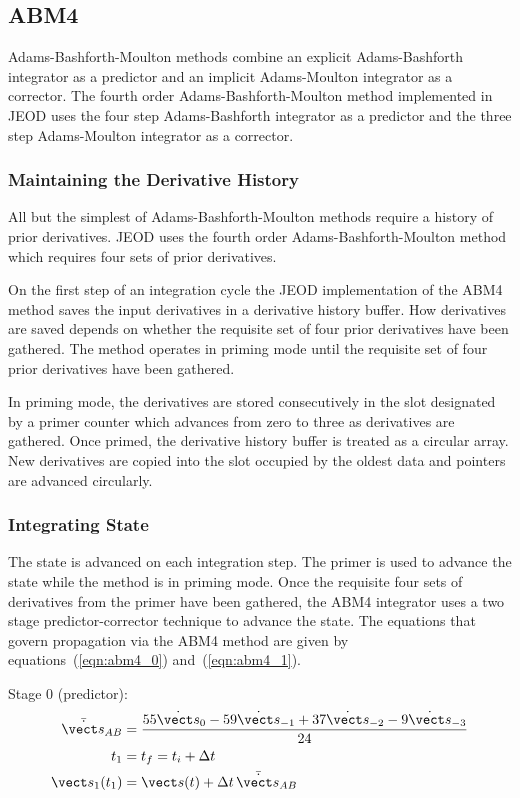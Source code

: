 \subsection{ABM4}

Adams-Bashforth-Moulton methods combine an explicit Adams-Bashforth
integrator as a predictor and an implicit Adams-Moulton integrator
as a corrector. The fourth order Adams-Bashforth-Moulton method
implemented in JEOD uses the four step Adams-Bashforth integrator
as a predictor and the three step Adams-Moulton integrator as a corrector.

\subsubsection{Maintaining the Derivative History}
All but the simplest of Adams-Bashforth-Moulton methods require a history
of prior derivatives. JEOD uses the fourth order Adams-Bashforth-Moulton method
which requires four sets of prior derivatives.

On the first step of an integration cycle the JEOD implementation of the
ABM4 method saves the input derivatives in a derivative history buffer.
How derivatives are saved depends on whether the requisite set of four prior
derivatives have been gathered. The method operates in priming mode until the
requisite set of four prior derivatives have been gathered.

In priming mode, the derivatives are stored consecutively in the slot designated
by a primer counter which advances from zero to three as derivatives are
gathered. Once primed, the derivative history buffer is treated as a circular
array. New derivatives are copied into the slot occupied by the oldest data
and pointers are advanced circularly.

\subsubsection{Integrating State}
The state is advanced on each integration step. The primer is used to
advance the state while the method is in priming mode.
Once the requisite four sets of derivatives from the primer have been gathered,
the ABM4 integrator uses a two stage predictor-corrector technique to advance
the state.
The equations that govern propagation via the ABM4 method are given by
equations~(\ref{eqn:abm4_0}) and~(\ref{eqn:abm4_1})\cite{hamming:1986}.

Stage 0 (predictor):
\begin{equation}
\label{eqn:abm4_0}
\begin{split}
\bar {\dot{\vect s}}_{AB} &=
  \frac{55\dot{\vect s}_0 - 59\dot{\vect s}_{-1} +
        37\dot{\vect s}_{-2} - 9\dot{\vect s}_{-3}} {24} \\
t_1 &= t_f = t_i + \Delta t \\
\vect s_1(t_1) &= \vect s(t) + \Delta t \, \bar {\dot{\vect s}}_{AB}
\end{split}
\end{equation}

